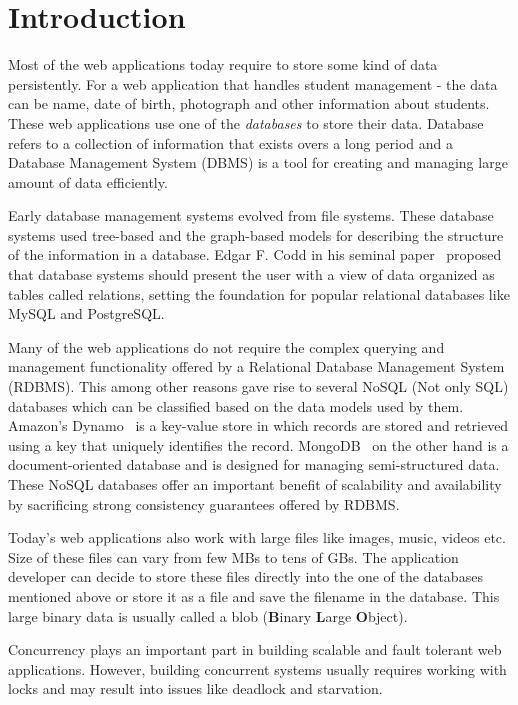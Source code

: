 \chapter{Introduction}
\label{chap:intro}

Most of the web applications today require to store some kind of data persistently. For a web application that handles student management - the data can be name, date of birth, photograph and other information about students. These web applications use one of the \textit{databases} to store their data. Database refers to a collection of information that exists overs a long period and a Database Management System (DBMS) is a tool for creating and managing large amount of data efficiently.

Early database management systems evolved from file systems. These database systems used tree-based and the graph-based models for describing the structure of the information in a database. Edgar F. Codd in his seminal paper~\cite{codd1970relational} proposed that database systems should present the user with a view of data organized as tables called relations, setting the foundation for popular relational databases like MySQL and PostgreSQL.

Many of the web applications do not require the complex querying and management functionality offered by a Relational Database Management System (RDBMS). This among other reasons gave rise to several NoSQL (Not only SQL) databases which can be classified based on the data models used by them. Amazon's Dynamo~\cite{decandia2007dynamo} is a key-value store in which records are stored and retrieved using a key that uniquely identifies the record.
MongoDB~\cite{chodorow2013mongodb} on the other hand is a document-oriented database and is designed for managing semi-structured data. These NoSQL databases offer an important benefit of scalability and availability by sacrificing strong consistency guarantees offered by RDBMS.

Today's web applications also work with large files like images, music, videos etc. Size of these files can vary from few MBs to tens of GBs. The application developer can decide to store these files directly into the one of the databases mentioned above or store it as a file and save the filename in the database. This large binary data is usually called a blob (\textbf{B}inary \textbf{L}arge \textbf{O}bject).

Concurrency plays an important part in building scalable and fault tolerant web applications. However, building concurrent systems usually requires working with locks and may result into issues like deadlock and starvation.


